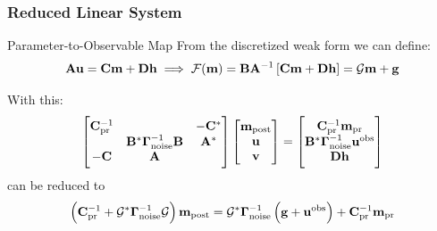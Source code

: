 \documentclass[
  pdf,
  10pt,
  xcolor={svgnames},
]{beamer}
\newcommand{\mc}[1]{\mathcal{#1}}
\newcommand{\mat}[1]{\mathbf{{#1}}}
\newcommand{\obs}{\mathbf{u}^{\rm obs}}
\begin{document}
\begin{frame}
  \frametitle{Reduced Linear System}
  \begin{block}{Parameter-to-Observable Map}
    From the discretized weak form we can define:
    \[
      \mat{A}\vb{u} = \mat{C} \vb{m} + \mat{D} \vb{h}
      \implies
      \mc{F}(\vb{m}) = \mat{B} \mat{A}^{-1} \left[
        \mat{C} \vb{m} + \mat{D} \vb{h}
      \right]
      = \mc{G} \vb{m} + \vb{g}
    \]
  \end{block}
  \pause
  With this:
  \[
    \begin{bmatrix}
      \mat{C}_{\rm pr}^{-1} & & -\mat{C}^* \\
       & \mat{B}^* \vb{\Gamma}_{\rm noise}^{-1} \mat{B} & \mat{A}^* \\
      -\mat{C} & \mat{A} & 
    \end{bmatrix}
    \begin{bmatrix} \vb{m}_{\rm post} \\ \vb{u} \\ \vb{v} \end{bmatrix}
    = \begin{bmatrix}
      \mat{C}_{\rm pr}^{-1} \vb{m}_{\rm pr} \\ 
      \mat{B}^* \vb{\Gamma}_{\rm noise}^{-1} \obs \\
      \mat{D} \vb{h}
    \end{bmatrix}
  \]
  can be reduced to
  \[
    \left(
      \mat{C}_{\rm pr}^{-1} + \mc{G}^* \vb{\Gamma}_{\rm noise}^{-1} \mc{G}
    \right)\vb{m}_{\rm post}
    = \mc{G}^* \vb{\Gamma}_{\rm noise}^{-1} \left( \vb{g} + \obs \right)
    + \mat{C}_{\rm pr}^{-1} \vb{m}_{\rm pr}
  \]
\end{frame}
\end{document}

